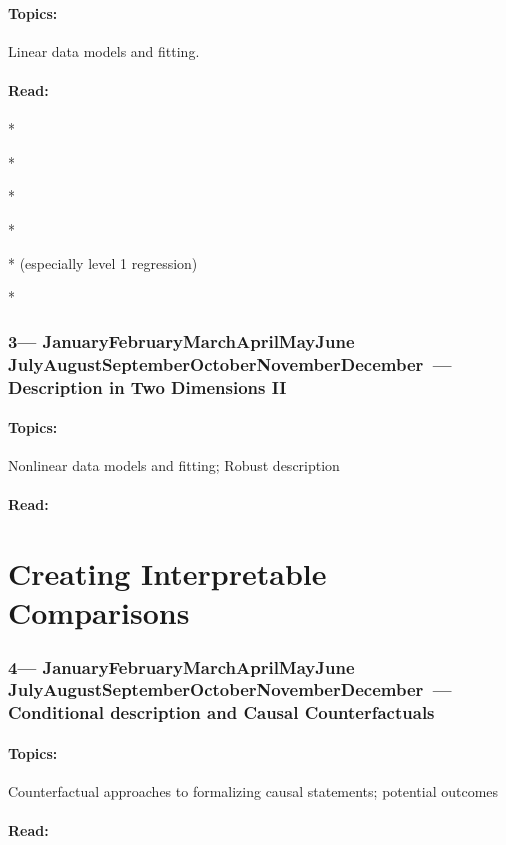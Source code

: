 \documentclass[10pt]{article}
\def\themonth{\ifcase\month\or
	January\or February\or March\or April\or May\or June\or
	July\or August\or September\or October\or November\or December\fi}
\begin{document}
\subsection{Topics:}  Linear data models and fitting.
\subsection{Read:}

*\citealp[Chap 2]{achen82}

*\citealp[Chap 4,5--8]{kaplan2012ism}

*\citealp[Chap 2--3]{james2013introduction}

*\citealp[Chap 1]{berk2008statistical}

*\citealp{berk2010you} (especially level 1 regression)

*\citealp[Chap 5 and 10]{wilcox2012introduction}

\AdvanceDate[7]
\section{3---\themonth~\the\day---Description in Two Dimensions II}

\subsection{Topics:} Nonlinear data models and fitting; Robust description

\subsection{Read:}


\part{Creating Interpretable Comparisons}

\AdvanceDate[7]
\section{4---\themonth~\the\day---Conditional description and Causal Counterfactuals}

\subsection{Topics:} Counterfactual approaches to formalizing causal
statements; potential outcomes
\subsection{Read:}
\end{document}
